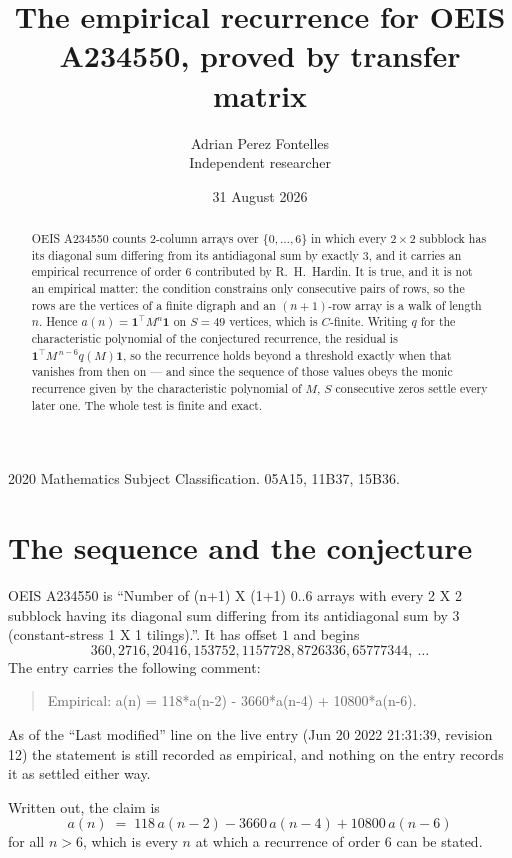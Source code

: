 \documentclass[11pt,a4paper]{article}
\title{The empirical recurrence for OEIS A234550, proved by transfer matrix}
\author{Adrian Perez Fontelles\\ \small Independent researcher}
\date{31 August 2026}
\theoremstyle{plain}
\theoremstyle{definition}
\begin{document}
\maketitle

\begin{abstract}
OEIS A234550 counts $2$-column arrays over $\{0,\dots,6\}$ in which every
$2\times2$ subblock has its diagonal sum differing from its antidiagonal sum by
exactly $3$, and it
carries an empirical recurrence of order $6$ contributed by R.~H.~Hardin. It is true,
and it is not an empirical matter: the condition constrains only consecutive pairs of rows,
so the rows are the vertices of a finite digraph and an $(n+1)$-row array is a walk of
length $n$. Hence $a(n)=\mathbf{1}^{\!\top}M^{n}\mathbf{1}$ on $S=49$ vertices, which
is $C$-finite. Writing $q$ for the characteristic polynomial of the conjectured recurrence,
the residual is $\mathbf{1}^{\!\top}M^{\,n-6}q(M)\mathbf{1}$, so the recurrence
holds beyond a threshold exactly when that vanishes from then on --- and since the sequence
of those values obeys the monic recurrence given by the characteristic polynomial of $M$,
$S$ consecutive zeros settle every later one. The whole test is finite and exact.
\end{abstract}

\noindent\small 2020 Mathematics Subject Classification. 05A15, 11B37, 15B36.\normalsize

\section{The sequence and the conjecture}

OEIS A234550 is ``Number of (n+1) X (1+1) 0..6 arrays with every 2 X 2 subblock having its diagonal sum differing from its antidiagonal sum by 3 (constant-stress 1 X 1 tilings).''. It has offset
$1$ and begins
\[
360, 2716, 20416, 153752, 1157728, 8726336, 65777344,\ \dots
\]
The entry carries the following comment:
\begin{quote}\small
Empirical: a(n) = 118*a(n-2) - 3660*a(n-4) + 10800*a(n-6).
\end{quote}
As of the ``Last modified'' line on the live entry (Jun 20 2022 21:31:39, revision 12) the statement is
still recorded as empirical, and nothing on the entry records it as settled either way.

Written out, the claim is
\begin{equation}\label{eq:conj}
a(n)\;=\;118\,a(n-2) - 3660\,a(n-4) + 10800\,a(n-6)
\end{equation}
for all $n>6$, which is every $n$ at which a recurrence of order $6$ can be
stated.
\end{document}
